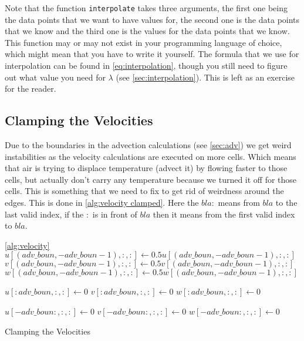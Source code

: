 Note that the function \texttt{interpolate} takes three arguments, the first one being the data points that we want to have values for, the second one is the data points that we know and the 
third one is the values for the data points that we know. This function may or may not exist in your programming language of choice, which might mean that you have to write it yourself. 
The formula that we use for interpolation can be found in \autoref{eq:interpolation}, though you still need to figure out what value you need for $\lambda$ (see \autoref{sec:interpolation}). 
This is left as an exercise for the reader.

\subsection{Clamping the Velocities}
Due to the boundaries in the advection calculations (see \autoref{sec:adv}) we get weird instabilities as the velocity calculations are executed on more cells. Which means that air is trying to 
displace temperature (advect it) by flowing faster to those cells, but actually don't carry any temperature because we turned it off for those cells. This is something that we need to fix to get 
rid of weirdness around the edges. This is done in \autoref{alg:velocity clamped}. Here the $bla:$ means from $bla$ to the last valid index, if the $:$ is in front of $bla$ then it means from 
the first valid index to $bla$.

\begin{algorithm}
    \autoref{alg:velocity}
    $u[(adv\_boun, -adv\_boun - 1), :, :] \leftarrow 0.5u[(adv\_boun, -adv\_boun - 1), :, :]$ \;
    $v[(adv\_boun, -adv\_boun - 1), :, :] \leftarrow 0.5v[(adv\_boun, -adv\_boun - 1), :, :]$ \;
    $w[(adv\_boun, -adv\_boun - 1), :, :] \leftarrow 0.5w[(adv\_boun, -adv\_boun - 1), :, :]$ \;

    $u[:adv\_boun, :, :] \leftarrow 0 $\;
    $v[:adv\_boun, :, :] \leftarrow 0 $\;
    $w[:adv\_boun, :, :] \leftarrow 0 $\;

    $u[-adv\_boun:, :, :] \leftarrow 0$ \;
    $v[-adv\_boun:, :, :] \leftarrow 0$ \;
    $w[-adv\_boun:, :, :] \leftarrow 0$ \;
    \caption{Clamping the Velocities}
    \label{alg:velocity clamped}
\end{algorithm}

